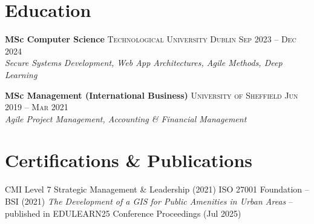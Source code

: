 \documentclass{simpleresume}
\begin{document}
\section{Education}
\noindent\textbf{MSc Computer Science}
  \hfill{\sffamily\scshape\small\color{secondary}Technological University Dublin}
  \hfill{\sffamily\scshape\small\color{muted}Sep 2023 -- Dec 2024}\\
  {\itshape\color{secondary}Secure Systems Development, Web App Architectures, Agile Methods, Deep Learning}

\vspace{0.05cm}
\noindent\textbf{MSc Management (International Business)}
  \hfill{\sffamily\scshape\small\color{secondary}University of Sheffield}
  \hfill{\sffamily\scshape\small\color{muted}Jun 2019 -- Mar 2021}\\
  {\itshape\color{secondary}Agile Project Management, Accounting \& Financial Management}

\section{Certifications \& Publications}
\noindent
{\sffamily\small\color{secondary}
  CMI Level 7 Strategic Management \& Leadership (2021) \quad\textbullet\quad
  ISO 27001 Foundation -- BSI (2021) \quad\textbullet\quad
  \textit{The Development of a GIS for Public Amenities in Urban Areas} -- published in EDULEARN25 Conference Proceedings (Jul 2025)
}
\end{document}
